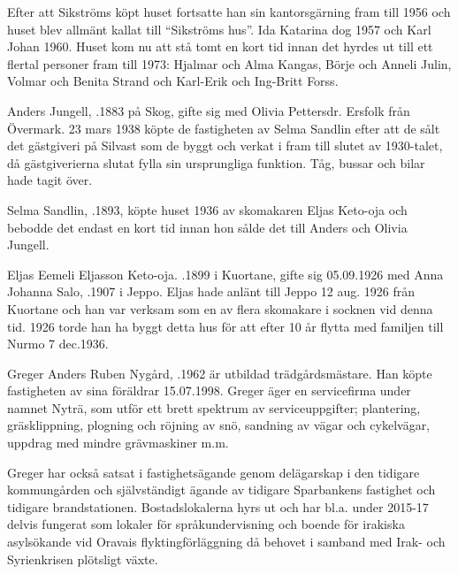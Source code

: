 {{{{Efter att Sikströms köpt huset fortsatte han sin kantorsgärning fram till 1956 och huset blev allmänt kallat till ``Sikströms hus''. Ida Katarina dog 1957 och Karl Johan 1960. Huset kom nu att stå tomt en kort tid innan det hyrdes ut till ett flertal personer fram till 1973:
Hjalmar och Alma Kangas, Börje och Anneli Julin, Volmar och Benita Strand och Karl-Erik och Ing-Britt Forss.

Anders Jungell, .1883 på Skog, gifte sig med Olivia Pettersdr. Ersfolk från Övermark. 23 mars 1938 köpte de fastigheten av Selma Sandlin efter att de sålt det gästgiveri på Silvast som de byggt och verkat i fram till slutet av 1930-talet, då gästgiverierna slutat fylla sin ursprungliga funktion. Tåg, bussar och bilar hade tagit över.

Selma Sandlin, .1893, köpte huset 1936 av skomakaren Eljas Keto-oja och bebodde det endast en kort tid innan hon sålde det till Anders och Olivia Jungell.

Eljas Eemeli Eljasson Keto-oja. .1899 i Kuortane, gifte sig 05.09.1926 med Anna Johanna Salo, .1907 i Jeppo. Eljas hade anlänt till Jeppo 12 aug. 1926 från Kuortane och han var verksam som en av flera skomakare i socknen vid denna tid. 1926 torde han ha byggt detta hus för att efter 10 år flytta med familjen till Nurmo 7 dec.1936.
\begin{jhchildren}
  \item {}
  \item {}
\end{jhchildren}




Greger Anders Ruben Nygård, .1962 är utbildad trädgårdsmästare. Han köpte fastigheten av sina föräldrar 15.07.1998. Greger äger en servicefirma under namnet Nyträ, som utför ett brett spektrum av serviceuppgifter; plantering, gräsklippning, plogning och röjning av snö, sandning av vägar och cykelvägar, uppdrag med mindre grävmaskiner m.m.


Greger har också satsat i fastighetsägande genom delägarskap i den tidigare kommungården och självständigt ägande av tidigare Sparbankens fastighet och tidigare brandstationen. Bostadslokalerna hyrs ut och har bl.a. under 2015-17 delvis fungerat som lokaler för språkundervisning och boende för irakiska asylsökande vid Oravais flyktingförläggning då behovet i samband med Irak- och Syrienkrisen plötsligt växte.

}}}}
